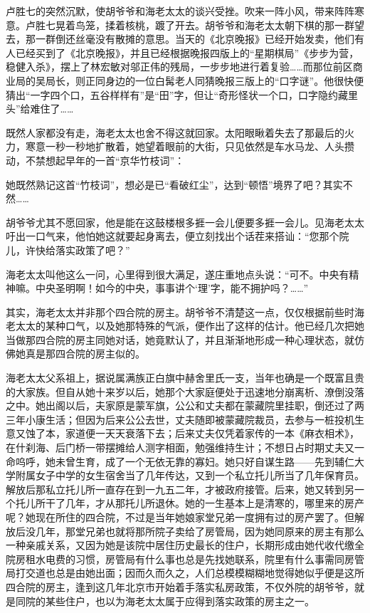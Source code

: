 \par 卢胜七的突然沉默，使胡爷爷和海老太太的谈兴受挫。吹来一阵小风，带来阵阵寒意。卢胜七晃着鸟笼，揉着核桃，踱了开去。胡爷爷和海老太太朝下棋的那一群望去，那一群倒还丝毫没有散摊的意思。当天的《北京晚报》已经开始发卖，他们有人已经买到了《北京晚报》，并且已经根据晚报四版上的“星期棋局”《步步为营，稳健入杀》，摆上了林宏敏对邬正伟的残局，一步步地进行着复验……而那位前区商业局的吴局长，则正同身边的一位白髯老人同猜晚报三版上的“口字谜”。他很快便猜出“一字四个口，五谷样样有”是“田”字，但让“奇形怪状一个口，口字隐约藏里头”给难住了……
\par 既然人家都没有走，海老太太也舍不得这就回家。太阳眼瞅着失去了那最后的火力，寒意一秒一秒地扩散着，她望着眼前的大街，只见依然是车水马龙、人头攒动，不禁想起早年的一首“京华竹枝词”：
\par 她既然熟记这首“竹枝词”，想必是已“看破红尘”，达到“顿悟”境界了吧？其实不然……
\par 胡爷爷尤其不愿回家，他是能在这鼓楼根多捱一会儿便要多捱一会儿。见海老太太吁出一口气来，他怕她这就要起身离去，便立刻找出个话茬来搭讪：“您那个院儿，许快给落实政策了吧？”
\par 海老太太叫他这么一问，心里得到很大满足，遂庄重地点头说：“可不。中央有精神嘛。中央圣明啊！如今的中央，事事讲个‘理’字，能不拥护吗？……”
\par 其实，海老太太并非那个四合院的房主。胡爷爷不清楚这一点，仅仅根据前些时海老太太的某种口气，以及她那特殊的气派，便作出了这样的估计。他已经几次把她当做那四合院的房主同她对话，她竟默认了，并且渐渐地形成一种心理状态，就仿佛她真是那四合院的房主似的。
\par 海老太太父系祖上，据说属满族正白旗中赫舍里氏一支，当年也确是一个既富且贵的大家族。但自从她十来岁以后，她那个大家庭便处于迅速地分崩离析、潦倒没落之中。她出阁以后，夫家原是蒙军旗，公公和丈夫都在蒙藏院里挂职，倒还过了两三年小康生活；但因为后来公公去世，丈夫随即被蒙藏院裁员，去参与一桩投机生意又蚀了本，家道便一天天衰落下去；后来丈夫仅凭着家传的一本《麻衣相术》，在什刹海、后门桥一带摆摊给人测字相面，勉强维持生计；不想日占时期丈夫又一命呜呼，她未曾生育，成了一个无依无靠的寡妇。她只好自谋生路——先到辅仁大学附属女子中学的女生宿舍当了几年传达，又到一个私立托儿所当了几年保育员。解放后那私立托儿所一直存在到一九五二年，才被政府接管。后来，她又转到另一个托儿所干了几年，才从那托儿所退休。她的一生基本上是清寒的，哪里来的房产呢？她现在所住的四合院，不过是当年她娘家堂兄弟一度拥有过的房产罢了。但解放后没几年，那堂兄弟也就将那所院子卖给了房管局，因为她同原来的房主有那么一种亲戚关系，又因为她是该院中居住历史最长的住户，长期形成由她代收代缴全院房租水电费的习惯，房管局有什么事也总是先找她联系，院里有什么事需同房管局打交道也总是由她出面；因而久而久之，人们总模模糊糊地觉得她似乎便是这所四合院的房主，逢到这几年北京市开始着手落实私房政策，不仅外院的胡爷爷，就是同院的某些住户，也以为海老太太属于应得到落实政策的房主之一。
